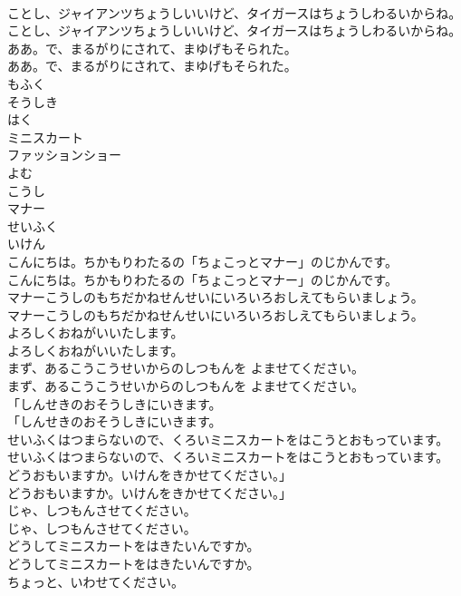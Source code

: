 \documentclass[8pt]{extreport}
\begin{document}
\begin{CJK}{UTF8}{min}
\\	ことし、ジャイアンツちょうしいいけど、タイガースはちょうしわるいからね。
\\	ことし、ジャイアンツちょうしいいけど、タイガースはちょうしわるいからね。
\\	ああ。で、まるがりにされて、まゆげもそられた。
\\	ああ。で、まるがりにされて、まゆげもそられた。
\\	もふく
\\	そうしき
\\	はく
\\	ミニスカート
\\	ファッションショー
\\	よむ
\\	こうし
\\	マナー
\\	せいふく
\\	いけん
\\	こんにちは。ちかもりわたるの「ちょこっとマナー」のじかんです。
\\	こんにちは。ちかもりわたるの「ちょこっとマナー」のじかんです。
\\	マナーこうしのもちだかねせんせいにいろいろおしえてもらいましょう。
\\	マナーこうしのもちだかねせんせいにいろいろおしえてもらいましょう。
\\	よろしくおねがいいたします。
\\	よろしくおねがいいたします。
\\	まず、あるこうこうせいからのしつもんを よませてください。
\\	まず、あるこうこうせいからのしつもんを よませてください。
\\	「しんせきのおそうしきにいきます。
\\	「しんせきのおそうしきにいきます。
\\	せいふくはつまらないので、くろいミニスカートをはこうとおもっています。
\\	せいふくはつまらないので、くろいミニスカートをはこうとおもっています。
\\	どうおもいますか。いけんをきかせてください。」
\\	どうおもいますか。いけんをきかせてください。」
\\	じゃ、しつもんさせてください。
\\	じゃ、しつもんさせてください。
\\	どうしてミニスカートをはきたいんですか。
\\	どうしてミニスカートをはきたいんですか。
\\	ちょっと、いわせてください。

\end{CJK}
\end{document}
